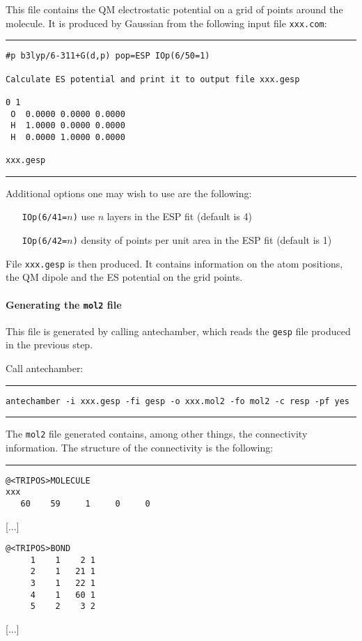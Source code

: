 \documentclass[a4paper]{report}
\begin{document}
This file contains the QM electrostatic potential on a grid of points around the
molecule. It is produced by Gaussian from the following input file \texttt{xxx.com}:

\rule{8cm}{1pt}
\begin{verbatim}
#p b3lyp/6-311+G(d,p) pop=ESP IOp(6/50=1)

Calculate ES potential and print it to output file xxx.gesp

0 1
 O  0.0000 0.0000 0.0000
 H  1.0000 0.0000 0.0000
 H  0.0000 1.0000 0.0000

xxx.gesp
\end{verbatim}
\rule{8cm}{1pt}

Additional options one may wish to use are the following:
\begin{itemize}
\item[\texttt{IOp(6/41=$n$)}] use $n$ layers in the ESP fit (default is 4)
\item[\texttt{IOp(6/42=$n$)}] density of points per unit area in the ESP fit (default
is 1)
\end{itemize}

File \texttt{xxx.gesp} is then produced. It contains information on the atom
positions, the QM dipole and the ES potential on the grid points.

\paragraph*{Generating the \texttt{mol2} file}

This file is generated by calling antechamber, which reads the \texttt{gesp} file
produced in the previous step.

Call antechamber:

\rule{8cm}{1pt}
\begin{verbatim}
antechamber -i xxx.gesp -fi gesp -o xxx.mol2 -fo mol2 -c resp -pf yes
\end{verbatim}
\rule{8cm}{1pt}

The \texttt{mol2} file generated contains, among other things, the connectivity
information. The structure of the connectivity is the following:

\rule{8cm}{1pt}
\begin{verbatim}
@<TRIPOS>MOLECULE
xxx
   60    59     1     0     0
\end{verbatim}

[...]

\begin{verbatim}
@<TRIPOS>BOND
     1    1    2 1
     2    1   21 1
     3    1   22 1
     4    1   60 1
     5    2    3 2
\end{verbatim}
[...]
\end{document}

